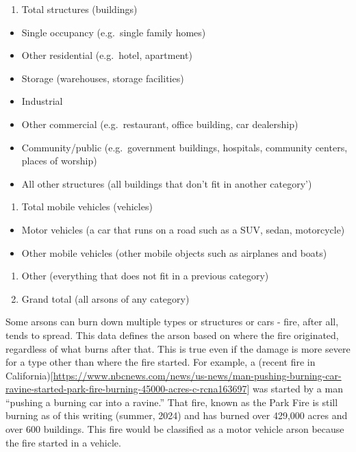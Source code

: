 \documentclass[
]{krantz}
\providecommand{\tightlist}{%
  \setlength{\itemsep}{0pt}\setlength{\parskip}{0pt}}
\begin{document}
\begin{enumerate}
\def\labelenumi{\arabic{enumi}.}
\tightlist
\item
  Total structures (buildings)
\end{enumerate}

\begin{itemize}
\tightlist
\item
  Single occupancy (e.g.~single family homes)
\item
  Other residential (e.g.~hotel, apartment)
\item
  Storage (warehouses, storage facilities)
\item
  Industrial
\item
  Other commercial (e.g.~restaurant, office building, car
  dealership)
\item
  Community/public (e.g.~government buildings, hospitals,
  community centers, places of worship)
\item
  All other structures (all buildings that don't fit in
  another category')
\end{itemize}

\begin{enumerate}
\def\labelenumi{\arabic{enumi}.}
\setcounter{enumi}{1}
\tightlist
\item
  Total mobile vehicles (vehicles)
\end{enumerate}

\begin{itemize}
\tightlist
\item
  Motor vehicles (a car that runs on a road such as a SUV,
  sedan, motorcycle)
\item
  Other mobile vehicles (other mobile objects such as
  airplanes and boats)
\end{itemize}

\begin{enumerate}
\def\labelenumi{\arabic{enumi}.}
\setcounter{enumi}{2}
\tightlist
\item
  Other (everything that does not fit in a previous
  category)
\item
  Grand total (all arsons of any category)
\end{enumerate}

Some arsons can burn down multiple types or structures or
cars - fire, after all, tends to spread. This data defines
the arson based on where the fire originated, regardless of
what burns after that. This is true even if the damage is
more severe for a type other than where the fire started.
For example, a (recent fire in
California){[}\url{https://www.nbcnews.com/news/us-news/man-pushing-burning-car-ravine-started-park-fire-burning-45000-acres-c-rcna163697}{]}
was started by a man ``pushing a burning car into a
ravine.'' That fire, known as the Park Fire is still burning
as of this writing (summer, 2024) and has burned over
429,000 acres and over 600 buildings. This fire would be
classified as a motor vehicle arson because the fire started
in a vehicle.
\end{document}
